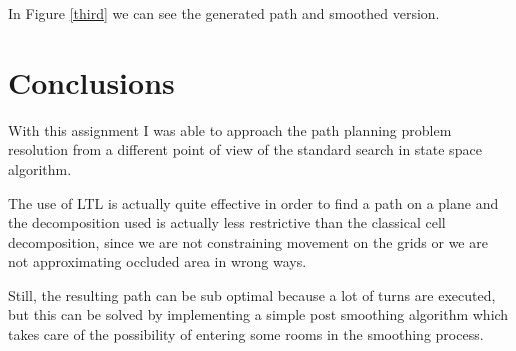 \documentclass[conference,12pt]{IEEEtran}
\begin{document}
In Figure \ref{third} we can see the generated path and smoothed version.

\section{Conclusions}

With this assignment I was able to approach the path planning problem resolution from a different point of view of the standard search in state space algorithm. 

The use of LTL is actually quite effective in order to find a path on a plane and the decomposition used is actually less restrictive than the classical cell decomposition, since we are not constraining movement on the grids or we are not approximating occluded area in wrong ways. 

Still, the resulting path can be sub optimal because a lot of turns are executed, but this can be solved by implementing a simple post smoothing algorithm which takes care of the possibility of entering some rooms in the smoothing process.
\end{document}

